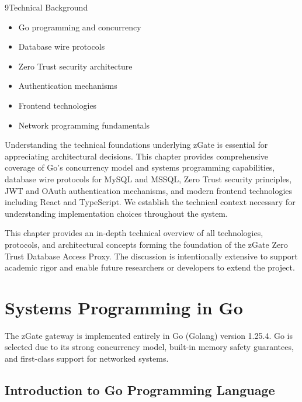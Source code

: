 
\begin{sectionintro}{9}{Technical Background}{
  \begin{itemize}[leftmargin=1.5em]
    \item Go programming and concurrency
    \item Database wire protocols
    \item Zero Trust security architecture
    \item Authentication mechanisms
    \item Frontend technologies
    \item Network programming fundamentals
  \end{itemize}
}
Understanding the technical foundations underlying zGate is essential for appreciating architectural decisions. This chapter provides comprehensive coverage of Go's concurrency model and systems programming capabilities, database wire protocols for MySQL and MSSQL, Zero Trust security principles, JWT and OAuth authentication mechanisms, and modern frontend technologies including React and TypeScript. We establish the technical context necessary for understanding implementation choices throughout the system.
\end{sectionintro}

This chapter provides an in-depth technical overview of all technologies, protocols, and architectural concepts forming the foundation of the zGate Zero Trust Database Access Proxy. The discussion is intentionally extensive to support academic rigor and enable future researchers or developers to extend the project.

\section{Systems Programming in Go}

The zGate gateway is implemented entirely in Go (Golang) version 1.25.4. Go is selected due to its strong concurrency model, built-in memory safety guarantees, and first-class support for networked systems.

\subsection{Introduction to Go Programming Language}

